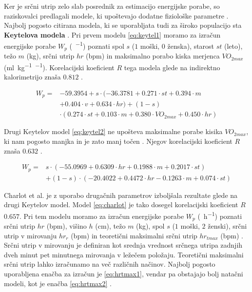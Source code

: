 Ker je srčni utrip zelo slab posrednik za estimacijo energijske porabe, so raziskovalci predlagali modele, ki upoštevajo dodatne fiziološke parametre \cite{charlot2014improvement}. Najbolj pogosto citirana modela, ki se uporabljata tudi za široko populacijo sta \textbf{Keytelova modela} \cite{keytel2005prediction}. Pri prvem modelu \eqref{eq:keytel1} moramo za izračun energijske porabe $W_p$ (\si{\kcal.\min^{-1}}) poznati spol $s$ ($1$ moški, $0$ ženska), starost $st$ (leto), težo $m$ (\si{\kg}), srčni utrip $hr$ (\si{bpm}) in maksimalno porabo kiska merjenca $VO_{2max}$ (\si{\ml.\kg^{-1}.\min^{-1}}). Korelacijski koeficient $R$ tega modela glede na indirektno kalorimetrijo znaša $0.812$ \cite{charlot2014improvement}.

\begin{align} \label{eq:keytel1}
W_p = & -59.3954 + s \cdot (-36.3781 + 0.271 \cdot st + 0.394 \cdot m  \nonumber \\
& + 0.404 \cdot v + 0.634 \cdot hr ) + (1 - s) \nonumber \\
& \cdot (0.274 \cdot st + 0.103 \cdot m + 0.380 \cdot VO_{2max} + 0.450 \cdot hr)
\end{align}

Drugi Keytelov model \eqref{eq:keytel2} ne upošteva maksimalne porabe kisika $VO_{2max}$, ki nam pogosto manjka in je zato manj točen \cite{keytel2005prediction}. Njegov korelacijski koeficient $R$ znaša $0.632$ \cite{charlot2014improvement}.

\begin{align}\label{eq:keytel2}
 W_p = & s \cdot (-55.0969 + 0.6309 \cdot hr + 0.1988 \cdot m + 0.2017 \cdot st) \nonumber \\
 & + (1 - s) \cdot (-20.4022 + 0.4472 \cdot hr - 0.1263 \cdot m + 0.074 \cdot st)
\end{align}

Charlot et al. \cite{charlot2014improvement} je z uporabo drugačnih parametrov izboljšala rezultate glede na drugi Keytelov model. Model \eqref{eq:charlot} je tako dosegel korelacijski koeficient $R$ $0.657$. Pri tem modelu moramo za izračun energijske porabe $W_p$ (\si{\kcal.\hour^{-1}})  poznati srčni utrip $hr$ (\si{bpm}), višino $h$ (\si{\cm}), težo $m$ (\si{\kg}), spol $s$ ($1$ moški, $2$ ženski), srčni utrip v mirovanju $hr_r$ (\si{bpm}) in teoretični maksimalni srčni utrip $hr_{tmax}$ (\si{bpm}) \cite{charlot2014improvement}. Srčni utrip v mirovanju je definiran kot srednja vrednost srčnega utripa zadnjih dveh minut pet minutnega mirovanja v ležečem položaju. Teoretični maksimalni srčni utrip lahko izračunamo na več različnih načinov. Najbolj pogosto uporabljena enačba za izračun je \eqref{eq:hrtmax1}, vendar pa obstajajo bolj natačni modeli, kot je enačba \eqref{eq:hrtmax2} \cite{miller1993predicting}. 


